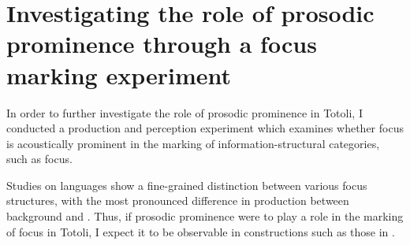 
\section[Focus marking experiment]{Investigating the role of prosodic prominence through a focus marking experiment}
\label{sec:Fokus}

In order to further investigate the role of prosodic prominence in Totoli, I conducted a production and perception experiment which examines whether focus is acoustically prominent in the marking of information-structural categories, such as focus.





Studies on  languages show a fine-grained distinction between various focus structures, with the most pronounced difference in production between background and  \citep{MUCKE201447, baumann2006prosodic, SWERTS2002629, KALAND2023101200, Lee_2015, 0023830919880217}. Thus, if prosodic prominence were to play a role in the marking of focus in Totoli, I  expect it to be observable in  constructions such as those in  . 




